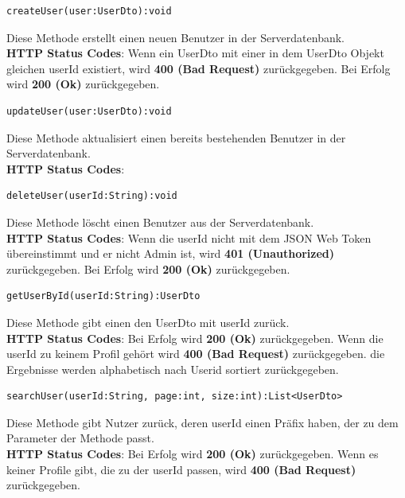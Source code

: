  \begin{lstlisting}
createUser(user:UserDto):void
\end{lstlisting}
Diese Methode erstellt einen neuen Benutzer in der Serverdatenbank.\\
\textbf{HTTP Status Codes}:
Wenn ein UserDto mit einer in dem UserDto Objekt gleichen userId existiert, wird \textbf{400 (Bad Request)} zurückgegeben. Bei Erfolg wird \textbf{200 (Ok)} zurückgegeben.
\vspace{1cm}
 \begin{lstlisting}
updateUser(user:UserDto):void
\end{lstlisting}
Diese Methode aktualisiert einen bereits bestehenden Benutzer in der Serverdatenbank.\\
\textbf{HTTP Status Codes}:
\vspace{1cm}
 \begin{lstlisting}
deleteUser(userId:String):void
\end{lstlisting}
Diese Methode löscht einen Benutzer aus der Serverdatenbank.\\
\textbf{HTTP Status Codes}:
Wenn die userId nicht mit dem JSON Web Token übereinstimmt und er nicht Admin ist, wird \textbf{401 (Unauthorized)} zurückgegeben. Bei Erfolg wird \textbf{200 (Ok)} zurückgegeben.
\vspace{1cm}
 \begin{lstlisting}
getUserById(userId:String):UserDto
\end{lstlisting}
Diese Methode gibt einen den UserDto mit userId zurück.\\
\textbf{HTTP Status Codes}:
Bei Erfolg wird \textbf{200 (Ok)} zurückgegeben. Wenn die userId zu keinem Profil gehört wird \textbf{400 (Bad Request)} zurückgegeben.
\vspace{1cm}
die Ergebnisse werden alphabetisch nach Userid sortiert zurückgegeben. 
\begin{lstlisting}
searchUser(userId:String, page:int, size:int):List<UserDto>
\end{lstlisting}
Diese Methode gibt Nutzer zurück, deren userId einen Präfix haben, der zu dem Parameter der Methode passt.\\
\textbf{HTTP Status Codes}:
Bei Erfolg wird \textbf{200 (Ok)} zurückgegeben. Wenn es keiner Profile gibt, die zu der userId passen, wird \textbf{400 (Bad Request)} zurückgegeben.
